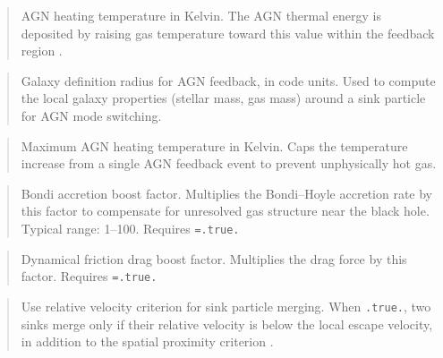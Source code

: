 \label{param:TAGN}

\begin{quote}
AGN heating temperature in Kelvin.  The AGN thermal energy is
deposited by raising gas temperature toward this value within the
feedback region .
\end{quote}

\label{param:r_gal}

\begin{quote}
Galaxy definition radius for AGN feedback, in code units.  Used to
compute the local galaxy properties (stellar mass, gas mass) around
a sink particle for AGN mode switching.
\end{quote}

\label{param:T2maxAGN}

\begin{quote}
Maximum AGN heating temperature in Kelvin.  Caps the temperature
increase from a single AGN feedback event to prevent unphysically
hot gas.
\end{quote}

\label{param:boost_acc}

\begin{quote}
Bondi accretion boost factor.  Multiplies the Bondi--Hoyle accretion
rate by this factor to compensate for unresolved gas structure near
the black hole.  Typical range: 1--100.  Requires
\texttt{=.true.}
\end{quote}

\label{param:boost_drag}

\begin{quote}
Dynamical friction drag boost factor.  Multiplies the drag force by
this factor.  Requires \texttt{=.true.}
\end{quote}

\label{param:vrel_merge}

\begin{quote}
Use relative velocity criterion for sink particle merging.  When
\texttt{.true.}, two sinks merge only if their relative velocity is
below the local escape velocity, in addition to the spatial proximity
criterion .
\end{quote}

